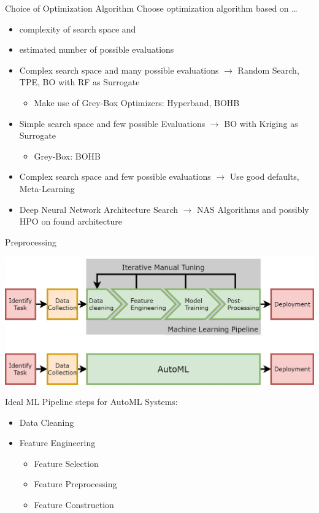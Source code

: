 \begin{frame}{Choice of Optimization Algorithm}
  Choose optimization algorithm based on \ldots
  \begin{itemize}
    \item complexity of search space and
    \item estimated number of possible evaluations
  \end{itemize}

  \begin{itemize}
    \item Complex search space and many possible evaluations $\rightarrow$ Random Search, TPE, BO with RF as Surrogate
    \begin{itemize}
      \item Make use of Grey-Box Optimizers: Hyperband, BOHB
    \end{itemize}
    \item Simple search space and few possible Evaluations $\rightarrow$ BO with Kriging as Surrogate
    \begin{itemize}
      \item Grey-Box: BOHB
    \end{itemize}
    \item Complex search space and few possible evaluations $\rightarrow$ Use good defaults, Meta-Learning
    \item Deep Neural Network Architecture Search $\rightarrow$ NAS Algorithms and possibly HPO on found architecture
  \end{itemize}
\end{frame}



\begin{frame}{Preprocessing}
  \begin{center}
    \includegraphics[width = 0.5\linewidth]{images/AutoMLPipeline.jpg}  
  \end{center}

  Ideal ML Pipeline steps for AutoML Systems:
  \begin{itemize}
    \item Data Cleaning
    \item Feature Engineering
    \begin{itemize}
      \item Feature Selection
      \item Feature Preprocessing
      \item Feature Construction  
    \end{itemize}
  \end{itemize}

\end{frame}

